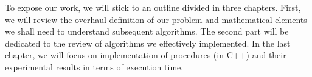 \documentclass[a4paper]{report}
\begin{document}
\vspace{1.2em}

To expose our work, we will stick to an outline divided in three chapters. First, we will review the overhaul definition of our problem and mathematical elements we shall need to understand subsequent algorithms. The second part will be dedicated to the review of algorithms we effectively implemented. In
the last chapter, we will focus on implementation of procedures (in C++) and their experimental results in terms of execution time.













\newpage
{}
\setcounter{page}{8}


	

\newpage
\end{document}
